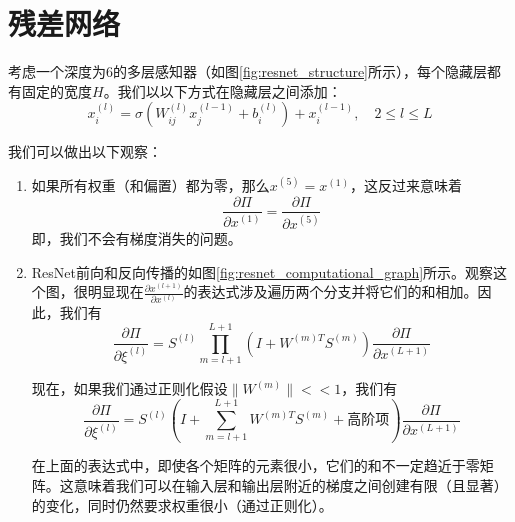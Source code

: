 \section{残差网络}
\label{sec:resnets}

考虑一个深度为6的多层感知器（如图\ref{fig:resnet_structure}所示），每个隐藏层都有固定的宽度$H$。我们以以下方式在隐藏层之间添加：
\begin{equation}
x_i^{(l)} = \sigma(W_{ij}^{(l)} x_j^{(l-1)} + b_i^{(l)}) + x_i^{(l-1)}, \quad 2 \leq l \leq L
\label{eq:resnet_equation}
\end{equation}

我们可以做出以下观察：

\begin{enumerate}
\item 如果所有权重（和偏置）都为零，那么$x^{(5)} = x^{(1)}$，这反过来意味着
\begin{equation}
\frac{\partial\Pi}{\partial x^{(1)}} = \frac{\partial\Pi}{\partial x^{(5)}}
\end{equation}
即，我们不会有梯度消失的问题。

\item ResNet前向和反向传播的如图\ref{fig:resnet_computational_graph}所示。观察这个图，很明显现在$\frac{\partial x^{(l+1)}}{\partial x^{(l)}}$的表达式涉及遍历两个分支并将它们的和相加。因此，我们有
\begin{equation}
\frac{\partial\Pi}{\partial\xi^{(l)}} = S^{(l)} \prod_{m=l+1}^{L+1} \left(I + W^{(m)T} S^{(m)}\right) \frac{\partial\Pi}{\partial x^{(L+1)}}
\label{eq:resnet_gradient}
\end{equation}

现在，如果我们通过正则化假设$\|W^{(m)}\| << 1$，我们有
\begin{equation}
\frac{\partial\Pi}{\partial\xi^{(l)}} = S^{(l)} \left(I + \sum_{m=l+1}^{L+1} W^{(m)T} S^{(m)} + \text{高阶项}\right) \frac{\partial\Pi}{\partial x^{(L+1)}}
\label{eq:resnet_gradient_approximation}
\end{equation}

在上面的表达式中，即使各个矩阵的元素很小，它们的和不一定趋近于零矩阵。这意味着我们可以在输入层和输出层附近的梯度之间创建有限（且显著）的变化，同时仍然要求权重很小（通过正则化）。
\end{enumerate}

